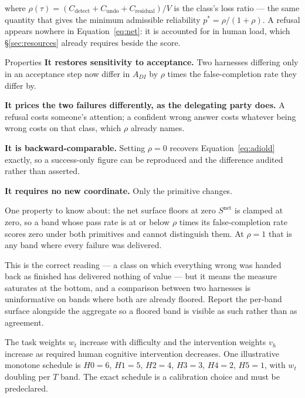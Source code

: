 \documentclass[11pt]{article}
\theoremstyle{definition}
\begin{document}
where $\rho(\tau) = (C_{\text{detect}} + C_{\text{undo}} + C_{\text{residual}})/V$ is the class's loss ratio --- the same quantity that gives the minimum admissible reliability $p^{*} = \rho/(1+\rho)$. A refusal appears nowhere in Equation~\eqref{eq:net}: it is accounted for in human load, which \S\ref{sec:resources} already requires beside the score.

\begin{claimbox}{Properties}
\textbf{It restores sensitivity to acceptance.} Two harnesses differing only in an acceptance step now differ in $A_{DI}$ by $\rho$ times the false-completion rate they differ by.

\textbf{It prices the two failures differently, as the delegating party does.} A refusal costs someone's attention; a confident wrong answer costs whatever being wrong costs on that class, which $\rho$ already names.

\textbf{It is backward-comparable.} Setting $\rho = 0$ recovers Equation~\eqref{eq:adiold} exactly, so a success-only figure can be reproduced and the difference audited rather than asserted.

\textbf{It requires no new coordinate.} Only the primitive changes.
\end{claimbox}

\begin{cautionbox}{One property to know about: the net surface floors at zero}
$S^{\text{net}}$ is clamped at zero, so a band whose pass rate is at or below
$\rho$ times its false-completion rate scores zero under both primitives and
cannot distinguish them. At $\rho = 1$ that is any band where every failure was
delivered.

This is the correct reading --- a class on which everything wrong was handed
back as finished has delivered nothing of value --- but it means the measure
saturates at the bottom, and a comparison between two harnesses is uninformative
on bands where both are already floored. Report the per-band surface alongside
the aggregate so a floored band is visible as such rather than as agreement.
\end{cautionbox}

\sloppy The task weights $w_t$ increase with difficulty and the intervention weights $v_h$ increase as required human cognitive intervention decreases. One illustrative monotone schedule is $H0{=}6$, $H1{=}5$, $H2{=}4$, $H3{=}3$, $H4{=}2$, $H5{=}1$, with $w_t$ doubling per $T$ band. The exact schedule is a calibration choice and must be predeclared.
\end{document}
